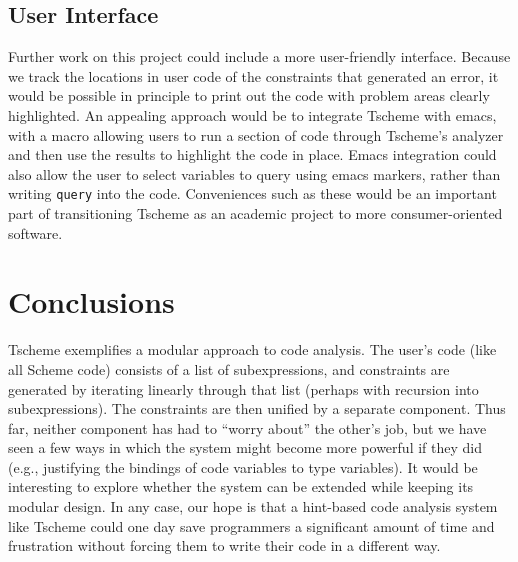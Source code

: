 \documentclass[a4paper]{article}
\newcommand{\T}[1]{\texttt{#1}}
\begin{document}


\subsection{User Interface}
Further work on this project could include a more user-friendly interface.  
Because we track the locations in user code of the constraints that generated
an error, it would be possible in principle to print out the code with problem 
areas clearly highlighted.  An appealing approach would be to integrate 
Tscheme with emacs, with a macro allowing users to run a section of code 
through Tscheme's analyzer and then use the results to highlight the code in 
place.  Emacs integration could also allow the user to select variables to 
query using emacs markers, rather than writing \T{query} into the code.
Conveniences such as these would be an important part of transitioning Tscheme 
as an academic project to more consumer-oriented software.

\section{Conclusions}
Tscheme exemplifies a modular approach to code analysis.  The user's code (like
all Scheme code) consists of a list of subexpressions, and constraints are
generated by iterating linearly through that list (perhaps with recursion into
subexpressions).  The constraints are then unified by a separate component.
Thus far, neither component has had to ``worry about'' the other's job, but we
have seen a few ways in which the system might become more powerful if they
did (e.g., justifying the bindings of code variables to type variables).  It
would be interesting to explore whether the system can be extended while keeping
its modular design.  In any case, our hope is that a hint-based code analysis
system like Tscheme could one day save programmers a significant amount of time
and frustration without forcing them to write their code in a different way.
\end{document}
